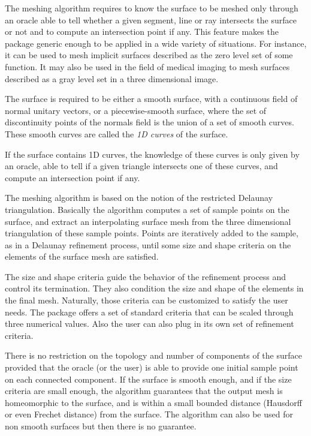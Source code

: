 The meshing algorithm requires to know the surface to be meshed
only  through an oracle able to  tell whether a
given segment, line or ray intersects the surface or not
and to compute an intersection point if any.
This feature makes the package generic enough to be
applied in a wide variety of situations. For instance, it can be
used to mesh implicit surfaces described as the zero level set
of some function. It may also be used in the field of medical imaging
to mesh surfaces described as a gray
level set in a three dimensional image.

The surface is required to be either a smooth surface, with a continuous
field of normal unitary vectors, or a piecewise-smooth surface, where the
set of discontinuity points of the normals field is the union of a set of
smooth curves. These smooth curves are called the \emph{1D curves} of the surface.

If the surface contains 1D curves, the knowledge of these curves is only
given by an oracle, able to tell if a given triangle intersects one of
these curves, and compute an intersection point if any.


The meshing algorithm is based on the notion of the restricted
Delaunay triangulation. Basically the algorithm  computes a set of
sample points on the surface, and extract an interpolating
surface mesh  from the three dimensional triangulation of these
sample points.
Points are iteratively added to the sample,
as in a Delaunay refinement process, until some size and shape
criteria on the elements of the surface mesh
are satisfied.


The size and shape criteria guide the  behavior of
the refinement process and control its termination.
They also condition  the size and shape of the elements in the final
mesh. Naturally, those criteria can be customized to satisfy
the user needs. The  package offers
a set of standard criteria that can be scaled through
three numerical values. Also the user can also plug in its own
set of refinement criteria.

There is no restriction on the topology and number of components
of the surface provided that the oracle (or the user)
is able to provide one initial sample point on each connected component.
If the surface is smooth enough, and if the size criteria are
small enough, the algorithm guarantees
that the output mesh is homeomorphic to the
surface, and  is within a small bounded distance
(Hausdorff or even Frechet distance) from the surface.
The algorithm can also be used for non smooth surfaces
but then there is no guarantee.




